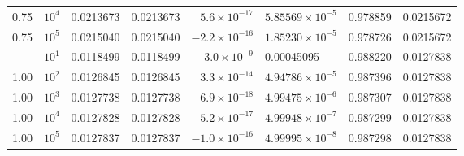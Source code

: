 \documentclass[11pt,reqno]{amsart}
\theoremstyle{plain}
\theoremstyle{definition}
\theoremstyle{remark}
\numberwithin{equation}{section}
\begin{document}
\begin{table}[p]
\begin{tabular}{@{}crllrllr@{}}
0.75 & $10^{4}$ & 0.0213673 & 0.0213673 & $5.6\times10^{-17}$ & $5.85569\times10^{-5}$ & 0.978859 & 0.0215672 \\
0.75 & $10^{5}$ & 0.0215040 & 0.0215040 & $-2.2\times10^{-16}$ & $1.85230\times10^{-5}$ & 0.978726 & 0.0215672 \\
\addlinespace
1.00 & $10^{1}$ & 0.0118499 & 0.0118499 & $3.0\times10^{-9}$ & 0.00045095 & 0.988220 & 0.0127838 \\
1.00 & $10^{2}$ & 0.0126845 & 0.0126845 & $3.3\times10^{-14}$ & $4.94786\times10^{-5}$ & 0.987396 & 0.0127838 \\
1.00 & $10^{3}$ & 0.0127738 & 0.0127738 & $6.9\times10^{-18}$ & $4.99475\times10^{-6}$ & 0.987307 & 0.0127838 \\
1.00 & $10^{4}$ & 0.0127828 & 0.0127828 & $-5.2\times10^{-17}$ & $4.99948\times10^{-7}$ & 0.987299 & 0.0127838 \\
1.00 & $10^{5}$ & 0.0127837 & 0.0127837 & $-1.0\times10^{-16}$ & $4.99995\times10^{-8}$ & 0.987298 & 0.0127838 \\
\bottomrule
\end{tabular}
\end{table}
\end{document}

